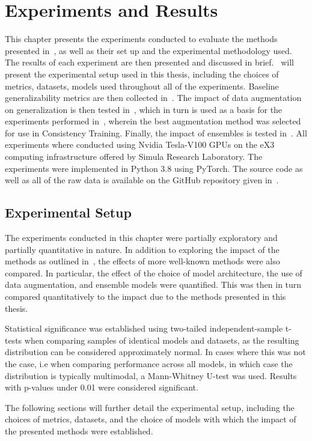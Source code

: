 \chapter{Experiments and Results}\label{experiments}
This chapter presents the experiments conducted to evaluate the methods presented in~, as well as their set up and the experimental methodology used. The results of each experiment are then presented and discussed in brief.~ will present the experimental setup used in this thesis, including the choices of metrics, datasets, models used throughout all of the experiments. Baseline generalizability metrics are then collected in~. The impact of data augmentation on generalization is then tested in~, which in turn is used as a basis for the experiments performed in~, wherein the best augmentation method was selected for use in Consistency Training. Finally, the impact of ensembles is tested in~. All experiments where conducted using Nvidia Tesla-V100 GPUs on the eX3 computing infrastructure offered by Simula Research Laboratory. The experiments were implemented in Python 3.8 using PyTorch. The source code as well as all of the raw data is available on the GitHub repository given in~.

\section{Experimental Setup}\label{exp_meth}
The experiments conducted in this chapter were partially exploratory and partially quantitative in nature. In addition to exploring the impact of the methods as outlined in~, the effects of more well-known methods were also compared. In particular, the effect of the choice of model architecture, the use of data augmentation, and ensemble models were quantified. This was then in turn compared quantitatively to the impact due to the methods presented in this thesis. 

Statistical significance was established using two-tailed independent-sample t-tests when comparing samples of identical models and datasets, as the resulting distribution can be considered approximately normal. In cases where this was not the case, i.e when comparing performance across all models, in which case the distribution is typically multimodal, a Mann-Whitney U-test was used. Results with p-values under 0.01 were considered significant. 

The following sections will further detail the experimental setup, including the choices of metrics, datasets, and the choice of models with which the impact of the presented methods were established. 

